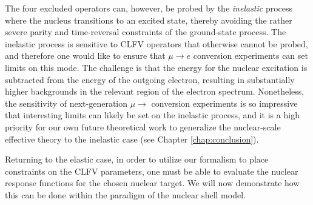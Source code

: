\documentclass[12pt,letterpaper]{book}
\begin{document}
The four excluded operators can, however, be probed by the \textit{inelastic} process where the nucleus transitions to an excited state, thereby avoiding the rather severe parity and time-reversal constraints of the ground-state process. The inelastic process is sensitive to CLFV operators that otherwise cannot be probed, and therefore one would like to ensure that $\mu\rightarrow e$ conversion experiments can set limits on this mode. The challenge is that the energy for the nuclear excitation is subtracted from the energy of the outgoing electron, resulting in substantially higher backgrounds in the relevant region of the electron spectrum. Nonetheless, the sensitivity of next-generation $\mu\rightarrow$ conversion experiments is so impressive that interesting limits can likely be set on the inelastic process, and it is a high priority for our own future theoretical work to generalize the nuclear-scale effective theory to the inelastic case (see Chapter \ref{chap:conclusion}).

Returning to the elastic case, in order to utilize our formalism to place constraints on the CLFV parameters, one must be able to evaluate the nuclear response functions for the chosen nuclear target. We will now demonstrate how this can be done within the paradigm of the nuclear shell model.
\end{document}
